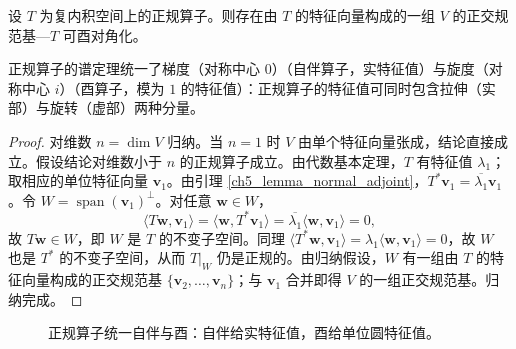 \begin{theorem}[正规算子的谱定理]\label{thm:spectral_theorem_normal}
设 $T$ 为复内积空间上的正规算子。则存在由 $T$ 的特征向量构成的一组 $V$ 的正交规范基---$T$ 可酉对角化。

正规算子的谱定理统一了梯度（对称中心 $0$）（自伴算子，实特征值）与旋度（对称中心 $i$）（酉算子，模为 $1$ 的特征值）：正规算子的特征值可同时包含拉伸（实部）与旋转（虚部）两种分量。
\end{theorem}

\begin{proof}
对维数 $n = \dim V$ 归纳。当 $n=1$ 时 $V$ 由单个特征向量张成，结论直接成立。假设结论对维数小于 $n$ 的正规算子成立。由代数基本定理，$T$ 有特征值 $\lambda_1$；取相应的单位特征向量 $\mathbf{v}_1$。由引理 \ref{ch5_lemma_normal_adjoint}，$T^*\mathbf{v}_1 = \overline{\lambda_1}\mathbf{v}_1$。令 $W = \operatorname{span}(\mathbf{v}_1)^\perp$。对任意 $\mathbf{w} \in W$，
\[
\langle T\mathbf{w}, \mathbf{v}_1 \rangle = \langle \mathbf{w}, T^*\mathbf{v}_1 \rangle = \overline{\lambda_1}\langle \mathbf{w}, \mathbf{v}_1 \rangle = 0,
\]
故 $T\mathbf{w} \in W$，即 $W$ 是 $T$ 的不变子空间。同理 $\langle T^*\mathbf{w}, \mathbf{v}_1\rangle = \lambda_1\langle \mathbf{w}, \mathbf{v}_1\rangle = 0$，故 $W$ 也是 $T^*$ 的不变子空间，从而 $T|_W$ 仍是正规的。由归纳假设，$W$ 有一组由 $T$ 的特征向量构成的正交规范基 $\{\mathbf{v}_2, \dots, \mathbf{v}_n\}$；与 $\mathbf{v}_1$ 合并即得 $V$ 的一组正交规范基。归纳完成。
\end{proof}

\begin{figure}[htbp]
\centering
{}
\caption{正规算子统一自伴与酉：自伴给实特征值，酉给单位圆特征值。}
\label{fig:normal_operator}
\end{figure}

